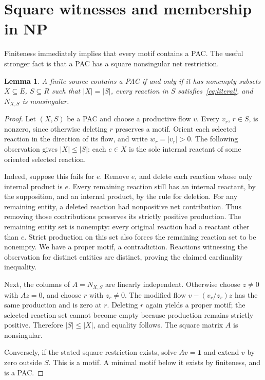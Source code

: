 \documentclass[11pt,a4paper]{article}
\newtheorem{lemma}[theorem]{Lemma}
\begin{document}
\section{Square witnesses and membership in NP}
Finiteness immediately implies that every motif contains a PAC. The useful
stronger fact is that a PAC has a square nonsingular net restriction.

\begin{lemma}\label{lem:square}
A finite source contains a PAC if and only if it has nonempty subsets
$X\subseteq E$, $S\subseteq R$ such that $|X|=|S|$, every reaction in $S$
satisfies~\eqref{eq:literal}, and $N_{X,S}$ is nonsingular.
\end{lemma}
\begin{proof}
Let $(X,S)$ be a PAC and choose a productive flow $v$. Every $v_r$, $r\in S$,
is nonzero, since otherwise deleting $r$ preserves a motif. Orient each
selected reaction in the direction of its flow, and write $w_r=|v_r|>0$.
The following observation gives $|X|\leq |S|$: each $e\in X$ is the sole
internal reactant of some oriented selected reaction.

Indeed, suppose this fails for $e$. Remove $e$, and delete each reaction
whose only internal product is $e$. Every remaining reaction still has an
internal reactant, by the supposition, and an internal product, by the rule
for deletion. For any remaining entity, a deleted reaction had nonpositive
net contribution. Thus removing those contributions preserves its strictly
positive production. The remaining entity set is nonempty: every original
reaction had a reactant other than $e$. Strict production on this set also
forces the remaining reaction set to be nonempty. We have a proper motif,
a contradiction. Reactions witnessing the observation for distinct entities
are distinct, proving the claimed cardinality inequality.

Next, the columns of $A=N_{X,S}$ are linearly independent. Otherwise choose
$z\ne0$ with $Az=0$, and choose $r$ with $z_r\ne0$. The modified flow
$v-(v_r/z_r)z$ has the same production and is zero at $r$. Deleting $r$
again yields a proper motif; the selected reaction set cannot become empty
because production remains strictly positive. Therefore $|S|\leq |X|$,
and equality follows. The square matrix $A$ is nonsingular.

Conversely, if the stated square restriction exists, solve $Av=\mathbf1$
and extend $v$ by zero outside $S$. This is a motif. A minimal motif below
it exists by finiteness, and is a PAC.
\end{proof}
\end{document}

